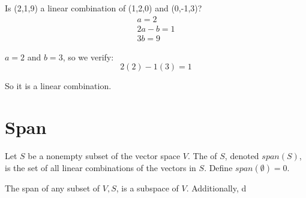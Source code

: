 \documentclass{article}
\begin{document}
\begin{example}[Vectors]
\end{example}

Is (2,1,9) a linear combination of (1,2,0) and (0,-1,3)?
\begin{align*}
    a = 2\\
    2a - b = 1\\
    3b = 9
\end{align*}

$a = 2$ and $b = 3$, so we verify:
\[
2(2) - 1(3) = 1
\]

So it is a linear combination.

\section{Span}
\begin{definition}
    Let $S$ be a nonempty subset of the vector space $V$. The  of $S$, denoted $span(S)$, is the set of all linear combinations of the vectors in $S$. Define $span(\emptyset) = 0$.
\end{definition}

\begin{theorem}
    The span of any subset of $V, S$, is a subspace of $V$. Additionally, d 
\end{theorem}
\end{document}
